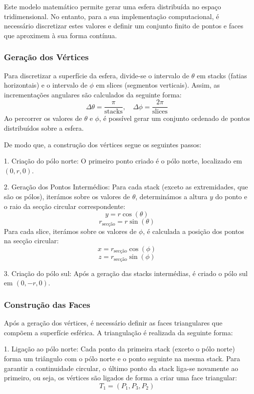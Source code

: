 \documentclass[12pt, a4paper]{article}
\begin{document}
Este modelo matemático permite gerar uma esfera distribuída no espaço tridimensional.
No entanto, para a sua implementação computacional, é necessário discretizar estes valores e
definir um conjunto finito de pontos e faces que aproximem à sua forma contínua.

\subsubsection{Geração dos Vértices}
Para discretizar a superfície da esfera, divide-se o intervalo de \( \theta \) em stacks
(fatias horizontais) e o intervalo de \( \phi \) em slices (segmentos verticais). Assim,
as incrementações angulares são calculados da seguinte forma:
\[
\Delta\theta = \frac{\pi}{\text{stacks}}, \quad \Delta\phi = \frac{2\pi}{\text{slices}}
\]
Ao percorrer os valores de \( \theta \) e \( \phi \), é possível gerar um conjunto ordenado
de pontos distribuídos sobre a esfera.

De modo que, a construção dos vértices segue os seguintes passos:

1. Criação do pólo norte: O primeiro ponto criado é o pólo norte, localizado em
\( (0, r, 0) \).

2. Geração dos Pontos Intermédios: Para cada stack (exceto as extremidades, que
são os pólos), iterámos sobre os valores de \( \theta \), determinámos a altura \( y \) do ponto
e o raio da secção circular correspondente:
\[
y = r \cos(\theta)
\]
\[
r_{\text{secção}} = r \sin(\theta)
\]
Para cada slice, iterámos sobre os valores de \( \phi \), é calculada a posição dos pontos
na secção circular:
\[
x = r_{\text{secção}} \cos(\phi)
\]
\[
z = r_{\text{secção}} \sin(\phi)
\]

3. Criação do pólo sul: Após a geração das stacks intermédias, é criado o pólo sul
em \( (0, -r, 0) \).

\subsubsection{Construção das Faces}
Após a geração dos vértices, é necessário definir as faces triangulares que compõem a superfície
esférica. A triangulação é realizada da seguinte forma:

1. Ligação ao pólo norte: Cada ponto da primeira stack (exceto o pólo norte) forma um
triângulo com o pólo norte e o ponto seguinte na mesma stack. Para garantir a continuidade circular,
o último ponto da stack liga-se novamente ao primeiro, ou seja, os vértices são ligados de forma a
criar uma face triangular:
\[
T_1 = (P_1, P_3, P_2)
\]
\end{document}
